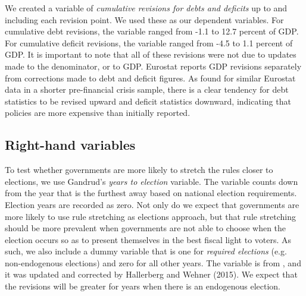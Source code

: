 \documentclass[]{article}
\begin{document}
We created a variable of \emph{cumulative revisions for debts and deficits} up to and including each revision point. We used these as our dependent variables. For cumulative debt revisions, the variable ranged from -1.1 to 12.7 percent of GDP. For cumulative deficit revisions, the variable ranged from -4.5 to 1.1 percent of GDP. It is important to note that all of these revisions were not due to updates made to the denominator, or to GDP. Eurostat reports GDP revisions separately from corrections made to debt and deficit figures. As \cite{DeCastro2013} found for similar Eurostat data in a shorter pre-financial crisis sample, there is a clear tendency for debt statistics to be revised upward and deficit statistics downward, indicating that policies are more expensive than initially reported.

\subsection{Right-hand variables}

To test whether governments are more likely to stretch the rules closer to elections, we use Gandrud's \citeyearpar{gandrudYrcurnt} \emph{years to election} variable. The variable counts down from the year that is the furthest away based on national election requirements. Election years are recorded as zero. Not only do we expect that governments are more likely to use rule stretching as elections approach, but that rule stretching should be more prevalent when governments are not able to choose when the election occurs so as to present themselves in the best fiscal light to voters. As such, we also include a dummy variable that is one for \emph{required elections} (e.g. non-endogenous elections) and zero for all other years. The variable is from \cite{Brender2008}, and it was updated and corrected by Hallerberg and Wehner (2015). We expect that the revisions will be greater for years when there is an endogenous election.
\end{document}
